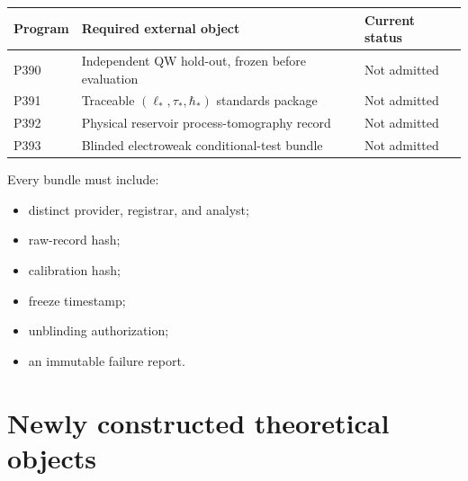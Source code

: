 \documentclass[11pt,a4paper,openany]{report}
\begin{document}
\begin{center}
\begingroup\small
\setlength{\tabcolsep}{2.5pt}
\renewcommand{\arraystretch}{1.16}
\begin{longtable}{@{}p{}p{}p{}@{}}
\toprule
\textbf{Program} & \textbf{Required external object} & \textbf{Current status} \\
\midrule
\endhead
P390 & Independent QW hold-out, frozen before evaluation & Not admitted \\
P391 & Traceable \((\ell_*,\tau_*,\hbar_*)\) standards package & Not admitted \\
P392 & Physical reservoir process-tomography record & Not admitted \\
P393 & Blinded electroweak conditional-test bundle & Not admitted \\
\bottomrule
\end{longtable}
\endgroup
\end{center}

Every bundle must include:

\begin{itemize}
\item 
distinct provider, registrar, and analyst;

\item 
raw-record hash;

\item 
calibration hash;

\item 
freeze timestamp;

\item 
unblinding authorization;

\item 
an immutable failure report.

\end{itemize}

\chapter{Newly constructed theoretical objects}
\end{document}
